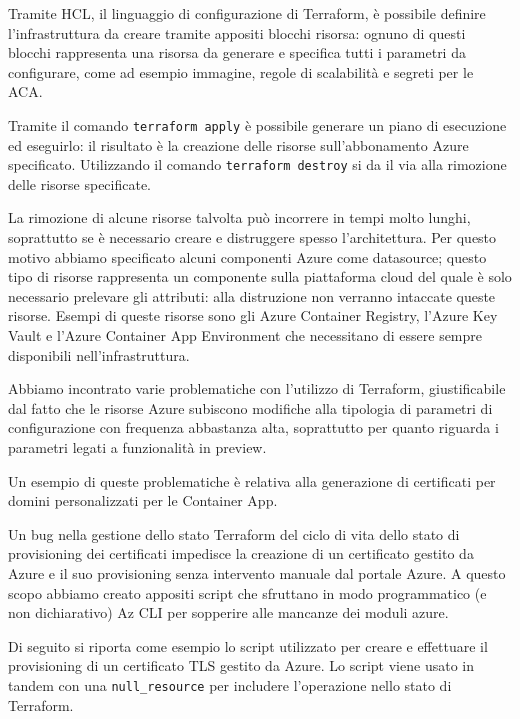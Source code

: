 Tramite HCL, il linguaggio di configurazione di Terraform, è possibile definire l'infrastruttura da creare tramite appositi blocchi risorsa: ognuno di questi blocchi rappresenta una risorsa da generare e specifica tutti i parametri da configurare, come ad esempio immagine, regole di scalabilità e segreti per le ACA.

Tramite il comando \texttt{terraform apply} è possibile generare un piano di esecuzione ed eseguirlo: il risultato è la creazione delle risorse sull'abbonamento Azure specificato. Utilizzando il comando \texttt{terraform destroy} si da il via alla rimozione delle risorse specificate.

La rimozione di alcune risorse talvolta può incorrere in tempi molto lunghi, soprattutto se è necessario creare e distruggere spesso l'architettura. Per questo motivo abbiamo specificato alcuni componenti Azure come datasource; questo tipo di risorse rappresenta un componente sulla piattaforma cloud del quale è solo necessario prelevare gli attributi: alla distruzione non verranno intaccate queste risorse. Esempi di queste risorse sono gli Azure Container Registry, l'Azure Key Vault e l'Azure Container App Environment che necessitano di essere sempre disponibili nell'infrastruttura.

Abbiamo incontrato varie problematiche con l'utilizzo di Terraform, giustificabile dal fatto che le risorse Azure subiscono modifiche alla tipologia di parametri di configurazione con frequenza abbastanza alta, soprattutto per quanto riguarda i parametri legati a funzionalità in preview.

Un esempio di queste problematiche è relativa alla generazione di certificati per domini personalizzati per le Container App.

Un bug nella gestione dello stato Terraform del ciclo di vita dello stato di provisioning dei certificati impedisce la creazione di un certificato gestito da Azure e il suo provisioning senza intervento manuale dal portale Azure. A questo scopo abbiamo creato appositi script che sfruttano in modo programmatico (e non dichiarativo) Az CLI per sopperire alle mancanze dei moduli azure.

Di seguito si riporta come esempio lo script utilizzato per creare e effettuare il provisioning di un certificato TLS gestito da Azure. Lo script viene usato in tandem con una \texttt{null\_resource} per includere l'operazione nello stato di Terraform.

